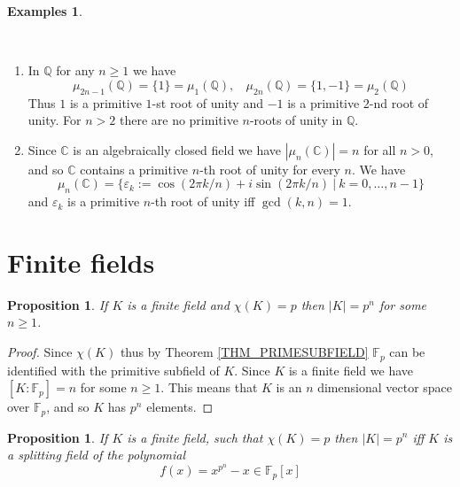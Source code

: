 \documentclass[12pt, letterpaper, oneside]{article}
\theoremstyle{plain}
\newtheorem{proposition}[theorem]{Proposition}
\theoremstyle{definition}
\newtheorem{examples}[theorem]{Examples}
\newcommand{\Q}{{\mathbb Q}}
\newcommand{\C}{{\mathbb C}}
\newcommand{\F}{{\mathbb F}}
\newcommand{\benu}{\begin{enumerate}}
\newcommand{\eenu}{\end{enumerate}}
\newcommand{\vs}{\vskip 5mm}
\newcommand{\isep}[1][0]{\setlength{\itemsep}{#1 mm}}
\begin{document}
\vs\vs

\begin{examples}\ 

\vskip -13mm 

\ 
\benu 
\isep[5]
\item In $\Q$ for any $n\geq 1$ we have 
$$\mu_{2n-1}(\Q) = \{1\} = \mu_{1}(\Q), \ \ \ \ \mu_{2n}(\Q) = \{1, -1\} = \mu_{2}(\Q)$$
Thus $1$ is a primitive $1$-st root of unity and $-1$ is a  primitive $2$-nd root of unity. 
For $n>2$ there are no primitive $n$-roots of unity in $\Q$.  

\item Since $\C$ is an algebraically closed field we have $|\mu_{n}(\C)| = n$ for all $n>0$, 
and so $\C$ contains a primitive $n$-th root of unity for every $n$. We have 
$$\mu_{n}(\C) = \{ \varepsilon_{k} := \cos (2\pi k/ n) + i\sin (2\pi k/n) \  | \ k = 0, \dots, n-1   \}$$ 
and $\varepsilon_{k}$ is a primitive $n$-th root of unity iff $\gcd(k, n) = 1$. 
\eenu

\end{examples}












\newpage
\section{Finite fields}
\label{SEC_FINITEFIELDS}


\begin{proposition}
If $K$ is a finite field and $\chi(K) = p$ then $|K| = p^{n}$ for some $n\geq 1$.   
\end{proposition}


\vs

\begin{proof}
Since $\chi(K)$ thus by Theorem \ref{THM_PRIMESUBFIELD} $\F_{p}$ can be
identified with the primitive subfield of $K$. Since $K$ is a finite field we have $[K : \F_{p}]  = n$
for some $n\geq 1$. This means that $K$ is an $n$ dimensional vector space over 
$\F_{p}$, and so $K$ has $p^{n}$ elements.   
\end{proof}



\vs\vs

\begin{proposition}
\label{PROP_FINITEFIELDSPLIT}
If  $K$ is a finite field, such that $\chi(K) = p$ then  $|K|= p^{n}$ iff 
$K$ is a splitting field of the polynomial 
$$f(x) = x^{p^{n}} -  x \in \F_{p}[x]$$ 
\end{proposition}
\end{document}

